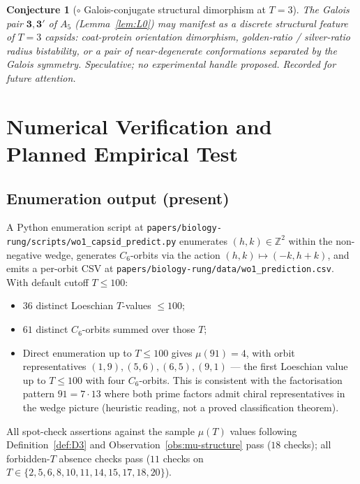 \documentclass[12pt]{article}
\newtheorem{conjecture}[theorem]{Conjecture}
\begin{document}
\begin{conjecture}[$\circ$ Galois-conjugate structural dimorphism at $T = 3$]\label{conj:C4}
The Galois pair $\mathbf{3}, \mathbf{3}'$ of $A_5$ (Lemma~\ref{lem:L0})
may manifest as a discrete structural feature of $T = 3$ capsids:
coat-protein orientation dimorphism, golden-ratio / silver-ratio
radius bistability, or a pair of near-degenerate conformations
separated by the Galois symmetry. Speculative; no experimental handle
proposed. Recorded for future attention.
\end{conjecture}

\section{Numerical Verification and Planned Empirical Test}\label{sec:num}

\subsection{Enumeration output (present)}

A Python enumeration script at
\texttt{papers/biology-rung/scripts/wo1\_capsid\_predict.py}
enumerates $(h, k) \in \mathbb{Z}^2$ within the non-negative wedge,
generates $C_6$-orbits via the action $(h, k)\mapsto(-k, h+k)$, and
emits a per-orbit CSV at
\texttt{papers/biology-rung/data/wo1\_prediction.csv}. With default
cutoff $T \le 100$:

\begin{itemize}
\item $36$ distinct Loeschian $T$-values $\le 100$;
\item $61$ distinct $C_6$-orbits summed over those $T$;
\item Direct enumeration up to $T \le 100$ gives $\mu(91) = 4$,
with orbit representatives $(1, 9), (5, 6), (6, 5), (9, 1)$ --- the
first Loeschian value up to $T \le 100$ with four $C_6$-orbits.
This is consistent with the factorisation pattern $91 = 7 \cdot 13$
where both prime factors admit chiral representatives in the wedge
picture (heuristic reading, not a proved classification theorem).
\end{itemize}

All spot-check assertions against the sample $\mu(T)$ values
following Definition~\ref{def:D3} and Observation~\ref{obs:mu-structure}
pass ($18$ checks); all forbidden-$T$ absence checks pass
($11$ checks on $T \in \{2, 5, 6, 8, 10, 11, 14, 15, 17, 18, 20\}$).
\end{document}
